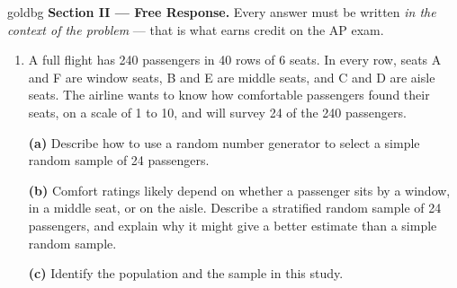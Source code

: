 \documentclass[12pt]{article}
\begin{document}
\vspace{0.08in}

\boxguard[27]
\begin{headlinebox}{goldbg}
\small
\textbf{Section II --- Free Response.} Every answer must be written \emph{in the context of the
problem} --- that is what earns credit on the AP exam.
\end{headlinebox}

\vspace{0.06in}

\begin{enumerate}[leftmargin=1.9em, itemsep=0.10in, resume]

  \item A full flight has 240 passengers in 40 rows of 6 seats. In every row, seats A and F
        are window seats, B and E are middle seats, and C and D are aisle seats. The airline
        wants to know how comfortable passengers found their seats, on a scale of 1 to 10, and
        will survey 24 of the 240 passengers.

        \vspace{6pt}

        \boxguard[18]
        \textbf{(a)} Describe how to use a random number generator to select a simple random
        sample of 24 passengers.\\[4pt]

        \vspace{4pt}
        \boxguard[18]
        \textbf{(b)} Comfort ratings likely depend on whether a passenger sits by a window, in a
        middle seat, or on the aisle. Describe a stratified random sample of 24 passengers, and
        explain why it might give a better estimate than a simple random sample.\\[4pt]

        \vspace{4pt}
        \boxguard[18]
        \textbf{(c)} Identify the population and the sample in this study.\\[4pt]

\end{enumerate}
\end{document}
